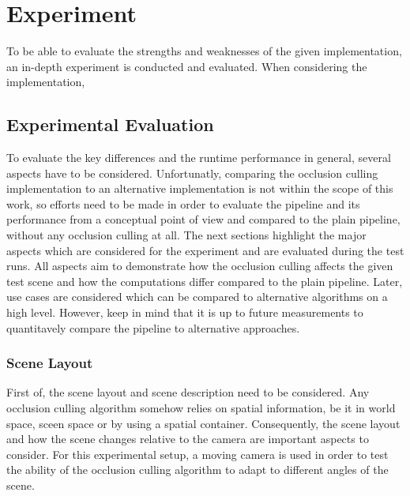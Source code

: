 \chapter{Experiment} \label{cpt-experiment}

To be able to evaluate the strengths and weaknesses of the given implementation, an in-depth 
experiment is conducted and evaluated. When considering the implementation, 


\section{Experimental Evaluation} \label{sec-experimental-evaluation}

To evaluate the key differences and the runtime performance in general, several aspects have to be considered.
Unfortunatly, comparing the occlusion culling implementation to an alternative implementation is not within the 
scope of this work, so efforts need to be made in order to evaluate the pipeline and its performance from a 
conceptual point of view and compared to the plain pipeline, without any occlusion culling at all. The next  
sections highlight the major aspects which are considered for the experiment and are evaluated during the 
test runs. All aspects aim to demonstrate how the occlusion culling affects the given test scene and how the 
computations differ compared to the plain pipeline. Later, use cases are considered which can be compared to 
alternative algorithms on a high level. However, keep in mind that it is up to future measurements to quantitavely
compare the pipeline to alternative approaches. 


\subsection*{Scene Layout}

First of, the scene layout and scene description need to be considered. Any occlusion culling algorithm somehow 
relies on spatial information, be it in world space, sceen space or by using a spatial container. Consequently, 
the scene layout and how the scene changes relative to the camera are important aspects to consider. For this 
experimental setup, a moving camera is used in order to test the ability of the occlusion culling algorithm to 
adapt to different angles of the scene. \\

